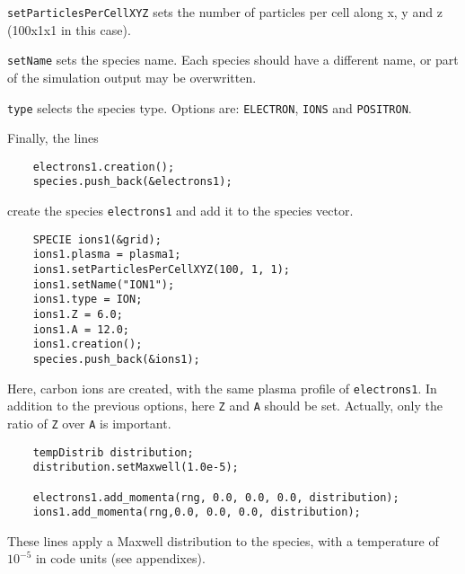 \documentclass[11pt,a4paper]{report}
\begin{document}
\verb+setParticlesPerCellXYZ+ sets the number of particles per cell along x, y and z (100x1x1 in this case).

\verb+setName+ sets the species name. Each species should have a different name, or part of the simulation output may be overwritten.

\verb+type+ selects the species type. Options are: \verb+ELECTRON+, \verb+IONS+ and \verb+POSITRON+.

Finally, the lines
\begin{lstlisting}
	electrons1.creation();                            
	species.push_back(&electrons1);
\end{lstlisting}
create the species \verb+electrons1+ and add it to the species vector. 
\begin{lstlisting}
	SPECIE ions1(&grid);
	ions1.plasma = plasma1;
	ions1.setParticlesPerCellXYZ(100, 1, 1);
	ions1.setName("ION1");
	ions1.type = ION;
	ions1.Z = 6.0;
	ions1.A = 12.0;
	ions1.creation();
	species.push_back(&ions1);
\end{lstlisting}  
Here, carbon ions are created, with the same plasma profile of \verb+electrons1+. In addition to the previous options, here \verb+Z+ and \verb+A+ should be set. Actually, only the ratio of \verb+Z+ over \verb+A+ is important.
\begin{lstlisting}
	tempDistrib distribution;
	distribution.setMaxwell(1.0e-5);

	electrons1.add_momenta(rng, 0.0, 0.0, 0.0, distribution);
	ions1.add_momenta(rng,0.0, 0.0, 0.0, distribution);
\end{lstlisting}
These lines apply a Maxwell distribution to the species, with a temperature of $10^{-5}$ in code units (see appendixes).
\end{document}
